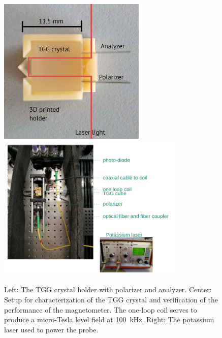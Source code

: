 \begin{refsection}
        \begin{figure}[h]
            \centering
            \includegraphics[height = 7cm]{Figures/muEDM/sensor.jpg}
            \hfill
            \includegraphics[height = 7cm]{Figures/muEDM/setup100kHz.png}
            \caption[muEDM: Faraday rotator sensor]{Left: The TGG crystal holder with polarizer and analyzer. Center: Setup for characterization of the TGG crystal and verification of the performance of the magnetometer. The one-loop coil serves to produce a micro-Tesla level field at \SI{100}{kHz}. Right: The potassium laser used to power the probe.}
        \label{fig:faraday_probe}
        \end{figure}


\end{refsection}
